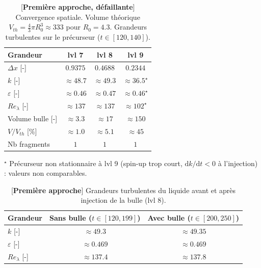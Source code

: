\begin{table}[H]
    \centering
    \caption{[\textbf{Première approche, défaillante}] Convergence spatiale. Volume théorique
    $V_{th} = \frac{4}{3}\pi R_0^3 \approx 333$ pour $R_0 = 4.3$. Grandeurs turbulentes sur le
    précurseur ($t \in [120,140]$).}
    \label{tab:convergence_bulle}
    \begin{tabular}{lccc}
        \toprule
        \textbf{Grandeur} & \textbf{lvl 7} & \textbf{lvl 8} & \textbf{lvl 9} \\
        \midrule
        $\Delta x$ [-]               & $0.9375$ & $0.4688$ & $0.2344$ \\
        \midrule
        $k$ [-]                      & $\approx 48.7$ & $\approx 49.3$ & $\approx 36.5^{\star}$ \\
        $\varepsilon$ [-]            & $\approx 0.46$ & $\approx 0.47$ & $\approx 0.46^{\star}$ \\
        $Re_\lambda$ [-]             & $\approx 137$  & $\approx 137$  & $\approx 102^{\star}$ \\
        \midrule
        Volume bulle [-]             & $\approx 3.3$  & $\approx 17$   & $\approx 150$ \\
        $V/V_{th}$ [\%]              & $\approx 1.0$  & $\approx 5.1$  & $\approx 45$ \\
        Nb fragments                 & $1$ & $1$ & $1$ \\
        \bottomrule
    \end{tabular}

    \vspace{0.4em}
    {\footnotesize $^{\star}$ Précurseur non stationnaire à lvl 9 (spin-up trop court,
    $\mathrm{d}k/\mathrm{d}t < 0$ à l'injection) : valeurs non comparables.}
\end{table}

\begin{table}[H]
    \centering
    \caption{[\textbf{Première approche}] Grandeurs turbulentes du liquide avant et après
    injection de la bulle (lvl 8).}
    \label{tab:turbu_bulle_compare}
    \begin{tabular}{lcc}
        \toprule
        \textbf{Grandeur} & \textbf{Sans bulle} ($t \in [120,199]$) & \textbf{Avec bulle} ($t \in [200,250]$) \\
        \midrule
        $k$ [-]            & $\approx 49.3$  & $\approx 49.35$ \\
        $\varepsilon$ [-]  & $\approx 0.469$ & $\approx 0.469$ \\
        $Re_\lambda$ [-]   & $\approx 137.4$ & $\approx 137.8$ \\
        \bottomrule
    \end{tabular}
\end{table}

